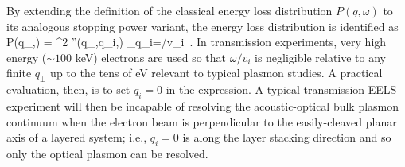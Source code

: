 By extending the definition of the classical energy loss distribution $P(q,\omega)$ to its analogous stopping power variant, the energy loss distribution is identified as
\ba
P(q_\perp,\omega) = \lb \lp{}\rp^2 \chi''(q_\perp,q_i,\omega) \rb_{q_i=\omega/v_i}\,\,\,.
\ea
In transmission experiments, very high energy ($\sim 100$ keV) electrons are used so that $\omega/v_i$ is negligible relative to any finite $q_\perp$ up to the tens of eV relevant to typical plasmon studies.  A practical evaluation, then, is to set $q_i=0$ in the expression.  A typical transmission EELS experiment will then be incapable of resolving the acoustic-optical bulk plasmon continuum when the electron beam is perpendicular to the easily-cleaved planar axis of a layered system; i.e., $q_i=0$ is along the layer stacking direction and so only the optical plasmon can be resolved.

